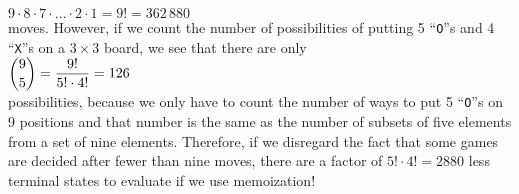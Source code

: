 \begin{enumerate}
      \hspace*{1.3cm}
      $9 \cdot 8 \cdot 7 \cdot {\dots} \cdot 2 \cdot 1 = 9! = 362\,880$
      \\[0.2cm]
      moves.  However, if we count the number of possibilities of putting 5 ``\texttt{O}''s and 4
      ``\texttt{X}''s on a $3 \times 3$ board, we see that there are only
      \\[0.2cm]
      \hspace*{1.3cm}
      $\displaystyle {9 \choose 5} = \frac{9!}{5! \cdot 4!} = 126$
      \\[0.2cm]
      possibilities, because we only have to count the number of ways to put 5 ``\texttt{O}''s on
      9 positions and that number is the same as the number of subsets of five elements from a set of nine elements.
      Therefore, if we disregard the fact that some games are decided after fewer than nine moves,  there are a
      factor of $5! \cdot 4! = 2880$ less terminal states to evaluate if we use memoization!


\end{enumerate}
